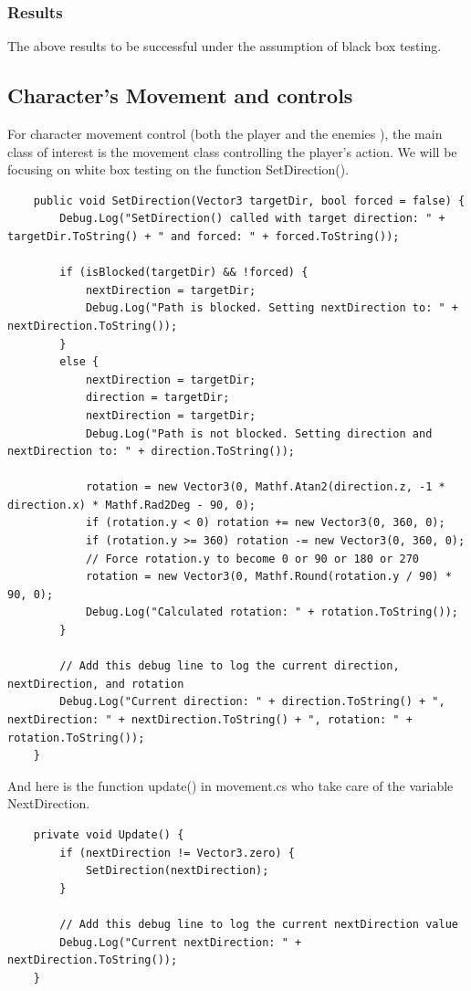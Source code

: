 \documentclass[11pt]{article}
\begin{document}
    \subsubsection*{Results}

    The above results to be successful under the assumption of black box testing.
    \subsection{Character's Movement and controls}
    For character movement control (both the player and the enemies ), the main class of interest is the movement class controlling the player's action. We will be focusing on white box testing on the function SetDirection().

    
    \begin{lstlisting}
    public void SetDirection(Vector3 targetDir, bool forced = false) {
        Debug.Log("SetDirection() called with target direction: " + targetDir.ToString() + " and forced: " + forced.ToString());
    
        if (isBlocked(targetDir) && !forced) {
            nextDirection = targetDir;
            Debug.Log("Path is blocked. Setting nextDirection to: " + nextDirection.ToString());
        }
        else {
            nextDirection = targetDir;
            direction = targetDir;
            nextDirection = targetDir;
            Debug.Log("Path is not blocked. Setting direction and nextDirection to: " + direction.ToString());
    
            rotation = new Vector3(0, Mathf.Atan2(direction.z, -1 * direction.x) * Mathf.Rad2Deg - 90, 0);
            if (rotation.y < 0) rotation += new Vector3(0, 360, 0);
            if (rotation.y >= 360) rotation -= new Vector3(0, 360, 0);
            // Force rotation.y to become 0 or 90 or 180 or 270
            rotation = new Vector3(0, Mathf.Round(rotation.y / 90) * 90, 0);
            Debug.Log("Calculated rotation: " + rotation.ToString());
        }
    
        // Add this debug line to log the current direction, nextDirection, and rotation
        Debug.Log("Current direction: " + direction.ToString() + ", nextDirection: " + nextDirection.ToString() + ", rotation: " + rotation.ToString());
    }
    \end{lstlisting}

    And here is the function update() in movement.cs who take care of the variable NextDirection.

    \begin{lstlisting}
    private void Update() {
        if (nextDirection != Vector3.zero) {
            SetDirection(nextDirection);
        }
    
        // Add this debug line to log the current nextDirection value
        Debug.Log("Current nextDirection: " + nextDirection.ToString());
    }
    \end{lstlisting}
    
\end{document}
